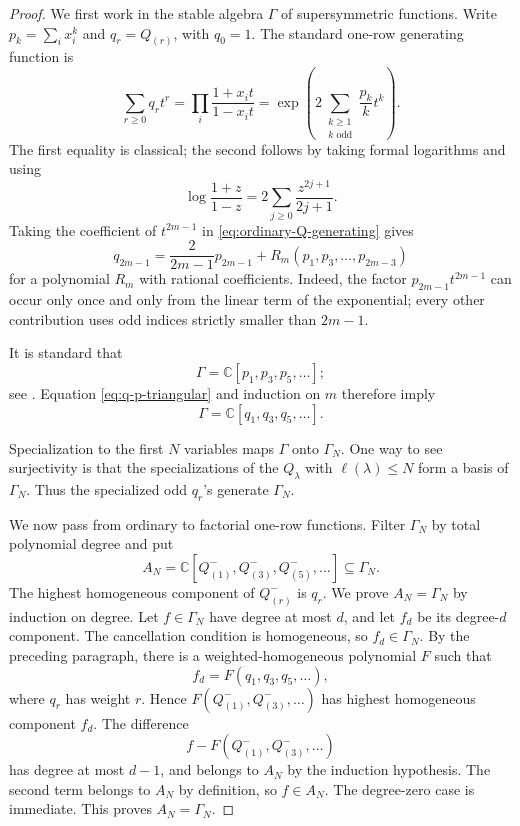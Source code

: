 \documentclass[11pt]{amsart}
\numberwithin{equation}{section}
\theoremstyle{definition}
\theoremstyle{remark}
\newcommand{\C}{\mathbb C}
\begin{document}
\begin{proof}
We first work in the stable algebra \(\Gamma\) of supersymmetric
functions.  Write \(p_k=\sum_i x_i^k\) and
\(q_r=Q_{(r)}\), with \(q_0=1\).  The standard one-row generating
function is
\begin{equation}
 \sum_{r\geq0}q_rt^r
 =\prod_i\frac{1+x_it}{1-x_it}
 =\exp\left(2\sum_{\substack{k\geq1\\k\text{ odd}}}
            \frac{p_k}{k}t^k\right).
 \label{eq:ordinary-Q-generating}
\end{equation}
The first equality is classical; the second follows by taking formal
logarithms and using
\[
 \log\frac{1+z}{1-z}
 =2\sum_{j\geq0}\frac{z^{2j+1}}{2j+1}.
\]
Taking the coefficient of \(t^{2m-1}\) in
\eqref{eq:ordinary-Q-generating} gives
\begin{equation}
 q_{2m-1}=\frac{2}{2m-1}p_{2m-1}
 +R_m(p_1,p_3,\ldots,p_{2m-3})
 \label{eq:q-p-triangular}
\end{equation}
for a polynomial \(R_m\) with rational coefficients.  Indeed, the
factor \(p_{2m-1}t^{2m-1}\) can occur only once and only from the
linear term of the exponential; every other contribution uses odd
indices strictly smaller than \(2m-1\).

It is standard that
\begin{equation}
 \Gamma=\C[p_1,p_3,p_5,\ldots];
 \label{eq:Gamma-power-sums}
\end{equation}
see \cite[Chapter~III, Section~8]{Macdonald1995}.  Equation
\eqref{eq:q-p-triangular} and induction on \(m\) therefore imply
\begin{equation}
 \Gamma=\C[q_1,q_3,q_5,\ldots].
 \label{eq:Gamma-odd-q}
\end{equation}

Specialization to the first \(N\) variables maps \(\Gamma\) onto
\(\Gamma_N\).  One way to see surjectivity is that the specializations
of the \(Q_\lambda\) with \(\ell(\lambda)\leq N\) form a basis of
\(\Gamma_N\).  Thus the specialized odd \(q_r\)'s generate
\(\Gamma_N\).

We now pass from ordinary to factorial one-row functions.  Filter
\(\Gamma_N\) by total polynomial degree and put
\[
 A_N=\C[Q^-_{(1)},Q^-_{(3)},Q^-_{(5)},\ldots]\subseteq\Gamma_N.
\]
The highest homogeneous component of \(Q^-_{(r)}\) is \(q_r\).
We prove \(A_N=\Gamma_N\) by induction on degree.  Let
\(f\in\Gamma_N\) have degree at most \(d\), and let \(f_d\) be its
degree-\(d\) component.  The cancellation condition is homogeneous,
so \(f_d\in\Gamma_N\).  By the preceding paragraph, there is a
weighted-homogeneous polynomial \(F\) such that
\[
 f_d=F(q_1,q_3,q_5,\ldots),
\]
where \(q_r\) has weight \(r\).  Hence
\(F(Q^-_{(1)},Q^-_{(3)},\ldots)\) has highest homogeneous component
\(f_d\).  The difference
\[
 f-F(Q^-_{(1)},Q^-_{(3)},\ldots)
\]
has degree at most \(d-1\), and belongs to \(A_N\) by the induction
hypothesis.  The second term belongs to \(A_N\) by definition, so
\(f\in A_N\).  The degree-zero case is immediate.  This proves
\(A_N=\Gamma_N\).


\end{proof}
\end{document}

